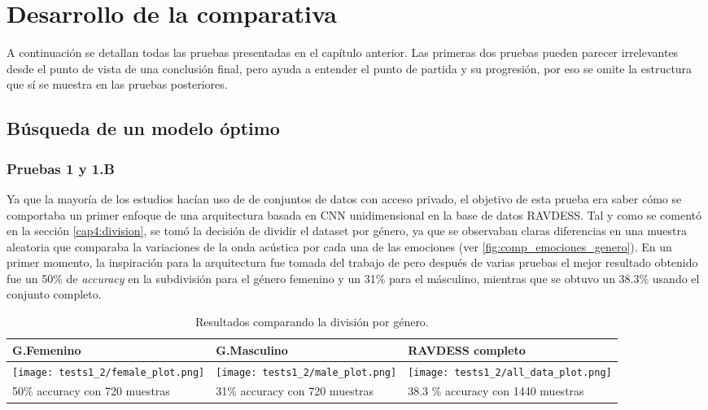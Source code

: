 \documentclass[11pt,a4paper,spanish]{book}
\begin{document}
	\chapter{Desarrollo de la comparativa}
	A continuación se detallan todas las pruebas presentadas en el capítulo anterior.
	Las primeras dos pruebas pueden parecer irrelevantes desde el punto de vista de una conclusión final, pero ayuda a entender el punto de partida y su progresión, por eso se omite la estructura que sí se muestra en las pruebas posteriores.
	
	\section{Búsqueda de un  modelo óptimo}
	\label{cap:4ModeloOptimo}

		\subsection{Pruebas 1 y 1.B}
		Ya que la mayoría de los estudios hacían uso de de conjuntos de datos con acceso privado, el objetivo de esta prueba era saber cómo se comportaba un primer enfoque de una arquitectura basada en CNN unidimensional en la base de datos RAVDESS. Tal y como se comentó en la sección \ref{cap4:division}, se tomó la decisión de dividir el dataset por género, ya que se observaban claras diferencias en una muestra aleatoria que comparaba la variaciones de la onda acústica por cada una de las emociones (ver \ref{fig:comp_emociones_genero}). En un primer momento, la inspiración para la arquitectura fue tomada del trabajo de \cite{Mustaqeem2020} pero después de varias pruebas el mejor resultado obtenido fue un 50\% de \emph{accuracy} en la subdivisión para el género femenino y un 31\% para el másculino, mientras que se obtuvo un 38.3\% usando el conjunto completo. 
	
	
	\begin{table}[H]
		\centering
		\begin{center}
			\begin{tabular}{|p{4.75cm} |p{4.75cm} |p{4.75cm}|}
				\hline
				G.Femenino & G.Masculino & RAVDESS completo\\ 
				\hline
				\texttt{[image: tests1\_2/female\_plot.png]} & \texttt{[image: tests1\_2/male\_plot.png]} & \texttt{[image: tests1\_2/all\_data\_plot.png]}\\
				\hline
				50\% accuracy con 720 muestras & 31\%  accuracy con 720 muestras & 38.3 \% accuracy con 1440 muestras \\
				\hline	
			\end{tabular}
			\caption{Resultados comparando la división por género.}
			\label{cap5:genderplots}
		\end{center}
	\end{table}
\end{document}
